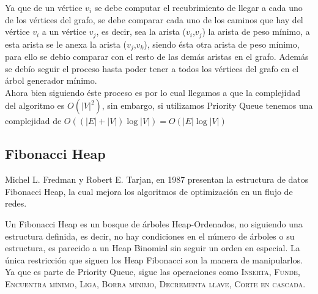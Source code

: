 \documentclass[a4paper, titlepage, 12pt]{article}
\theoremstyle{definition}%
\theoremstyle{Teorema}
\theoremstyle{break}
\begin{document}
Ya que de un vértice $v_i$ se debe computar el recubrimiento de llegar a cada uno de los vértices del grafo, 
se debe comparar cada uno de los caminos que hay del vértice $v_i$ a un vértice $v_j$, es decir, sea la arista ($v_i$,$v_j$) la arista 
de peso mínimo, a esta arista se le anexa la arista ($v_j$,$v_k$), siendo ésta otra arista de peso mínimo, para ello se debio comparar con 
el resto de las demás aristas en el grafo. Además se debío seguir el proceso hasta poder tener a todos los vértices del grafo en el árbol 
generador mínimo.\\

Ahora bien siguiendo éste proceso es por lo cual llegamos a que la complejidad del algoritmo es $O(|V|^2)$, sin embargo, si utilizamos 
Priority Queue tenemos una complejidad de $O((|E|+|V|)\log|V|)=O(|E|\log|V|)$\cite{Complejidad Prim}

\subsection{Fibonacci Heap}
Michel L. Fredman y Robert E. Tarjan, en 1987 presentan la estructura de datos Fibonacci Heap, la cual mejora los algoritmos de 
optimización en un flujo de redes.

Un Fibonacci Heap es un bosque de árboles Heap-Ordenados, no siguiendo una estructura definida, es decir, no hay condiciones en el número de 
árboles o su estructura, es parecido a un Heap Binomial sin seguir un orden en especial. La única restricción que siguen los Heap Fibonacci 
son la manera de manipularlos. Ya que es parte de Priority Queue, sigue las operaciones como \textsc{Inserta}, \textsc{Funde}, \textsc{Encuentra mínimo}, 
\textsc{Liga}, \textsc{Borra mínimo}, \textsc{Decrementa llave}, \textsc{Corte en cascada}.\\
\end{document}
